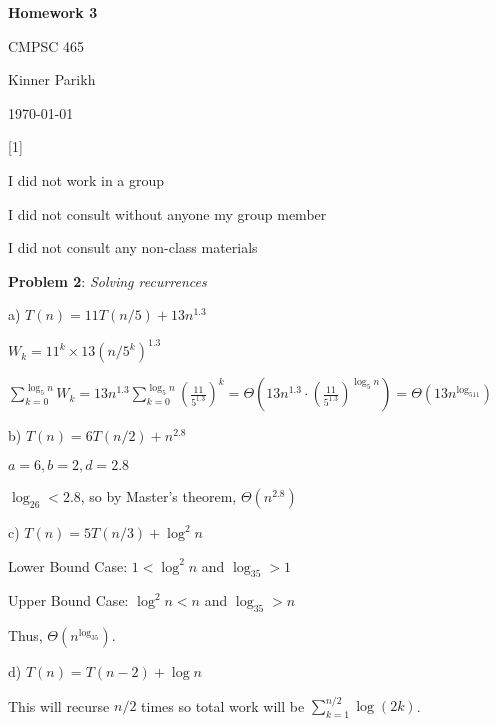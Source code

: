 \documentclass{article} %
\newcommand{\question}[2][]{\begin{flushleft}
        \textbf{Problem #1}: \textit{#2}

\end{flushleft}}
\newcommand{\maketitletwo}[2][]{\begin{center}
        \Large{\textbf{Homework #1}
            
            CMPSC 465} %
        \vspace{5pt}
        
        \normalsize{Kinner Parikh  %
        
        \today}        %
        \vspace{40pt}


        \newpage
        
\end{center}}
\begin{document}
    \maketitletwo[3]  %

    \question[1]{}
    \begin{center}
        
        I did not work in a group
    
        I did not consult without anyone my group member
    
        I did not consult any non-class materials
    \end{center}
    
    \newpage

    \question[2]{Solving recurrences}

    a) $T(n) = 11T(n / 5) + 13n^{1.3}$



    $W_k = 11^k \times 13(n/5^k)^{1.3}$

    $\sum_{k = 0}^{\log_5n} W_k = 13n^{1.3} \sum_{k = 0}^{\log_5n} \left(\frac{11}{5^{1.3}}\right)^k = \Theta(13n^{1.3} \cdot \left(\frac{11}{5^{1.3}}\right)^{\log_5n}) = \boxed{\Theta(13n^{\log_511})}$

    \vspace{5pt}

    b) $T(n) = 6T(n / 2) + n^{2.8}$

    $ a = 6, b = 2, d = 2.8$

    $\log_26 < 2.8$, so by Master's theorem, $\boxed{\Theta(n^{2.8})}$

    \vspace{5pt}

    c) $T(n) = 5T(n / 3) + \log^2n$



    Lower Bound Case: $1 < \log^2n$ and $\log_35 > 1$

    Upper Bound Case: $\log^2n < n$ and $\log_35 > n$

    Thus, $\boxed{\Theta(n^{\log_35})}$.

    \vspace{5pt}

    d) $T(n) = T(n - 2) + \log n$

    This will recurse $n/2$ times so total work will be $\sum_{k = 1}^{n/2}\log(2k)$.
\end{document}
